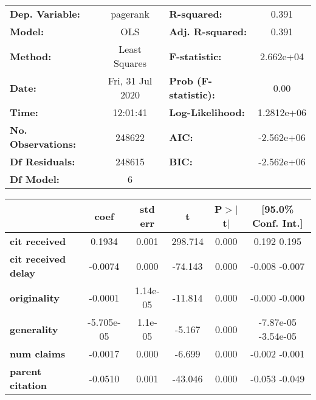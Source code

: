 \begin{center}
\begin{tabular}{lclc}
\toprule
\textbf{Dep. Variable:}     &     pagerank     & \textbf{  R-squared:         } &       0.391     \\
\textbf{Model:}             &       OLS        & \textbf{  Adj. R-squared:    } &       0.391     \\
\textbf{Method:}            &  Least Squares   & \textbf{  F-statistic:       } &   2.662e+04     \\
\textbf{Date:}              & Fri, 31 Jul 2020 & \textbf{  Prob (F-statistic):} &       0.00      \\
\textbf{Time:}              &     12:01:41     & \textbf{  Log-Likelihood:    } &   1.2812e+06    \\
\textbf{No. Observations:}  &      248622      & \textbf{  AIC:               } &   -2.562e+06    \\
\textbf{Df Residuals:}      &      248615      & \textbf{  BIC:               } &   -2.562e+06    \\
\textbf{Df Model:}          &           6      & \textbf{                     } &                 \\
\bottomrule
\end{tabular}
\begin{tabular}{lccccc}
                            & \textbf{coef} & \textbf{std err} & \textbf{t} & \textbf{P$>$$|$t$|$} & \textbf{[95.0\% Conf. Int.]}  \\
\midrule
\textbf{cit received}       &       0.1934  &        0.001     &   298.714  &         0.000        &         0.192     0.195       \\
\textbf{cit received delay} &      -0.0074  &        0.000     &   -74.143  &         0.000        &        -0.008    -0.007       \\
\textbf{originality}        &      -0.0001  &     1.14e-05     &   -11.814  &         0.000        &        -0.000    -0.000       \\
\textbf{generality}         &   -5.705e-05  &      1.1e-05     &    -5.167  &         0.000        &     -7.87e-05 -3.54e-05       \\
\textbf{num claims}         &      -0.0017  &        0.000     &    -6.699  &         0.000        &        -0.002    -0.001       \\
\textbf{parent citation}    &      -0.0510  &        0.001     &   -43.046  &         0.000        &        -0.053    -0.049       \\

\end{tabular}
\end{center}
